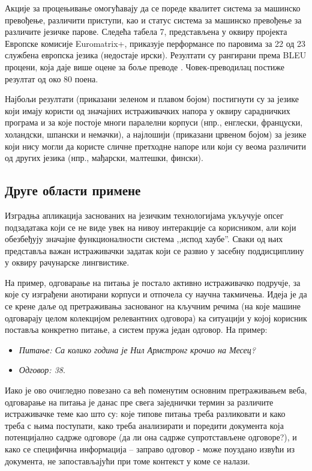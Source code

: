 \begin{multicols}{2}
Акције за процењивање омогућавају да се пореде квалитет система за машинско превођење, различити приступи, као и статус система за машинско превођење за различите језичке парове. Следећа табела 7, представљена у оквиру пројекта Европске комисије Euromatrix+, приказује перформансе по паровима за 22 од 23 службена европска језика (недостаје ирски). Резултати су рангирани према BLEU процени, која даје више оцене за боље преводе \cite{bleu1}. Човек-преводилац постиже резултат од око 80 поена. 

Најбољи резултати (приказани зеленом и плавом бојом) постигнути су за језике који имају користи од значајних истраживачких напора у оквиру сарадничких програма и за које постоје многи паралелни корпуси (нпр., енглески, француски, холандски, шпански и немачки), а најлошији (приказани црвеном бојом) за језике који нису могли да користе сличне претходне напоре или који су веома различити од других језика (нпр., мађарски, малтешки, фински). 

 \subsection {Друге области примене}
   
Изградња апликација заснованих на језичким технологијама укључује опсег подзадатака који се не виде увек на нивоу интеракције са корисником, али који обезбеђују значајне функционалности система ,,испод хаубе''. Сваки од њих представља важан истраживачки задатак који се развио у засебну поддисциплину у оквиру рачунарске лингвистике.

На пример, одговарање на питања је постало активно истраживачко подручје, за које су изграђени анотирани корпуси и отпочела су научна такмичења. Идеја је да се крене даље од претраживања заснованог на кључним речима (на које машине одговарају целом колекцијом релевантних одговора) ка ситуацији у којој корисник поставља конкретно питање, а систем пружа један одговор. На пример: 
\begin{itemize}
\item[] \textit{Питање: Са колико година је Нил Армстронг крочио на Месец?} 
\item[] \textit{Одговор: 38}. 
\end{itemize}

Иако је ово очигледно повезано са већ поменутим основним претраживањем веба, одговарање на питања је данас пре свега заједнички термин за различите истраживачке теме као што су: које типове питања треба разликовати и како треба с њима поступати, како треба анализирати и поредити документа која потенцијално садрже одговоре (да ли она садрже супротстављене одговоре?), и како се специфична информација – заправо одговор -  може поуздано извући из документа, не запостављајући при томе контекст у коме се налази. 


\end{multicols}
